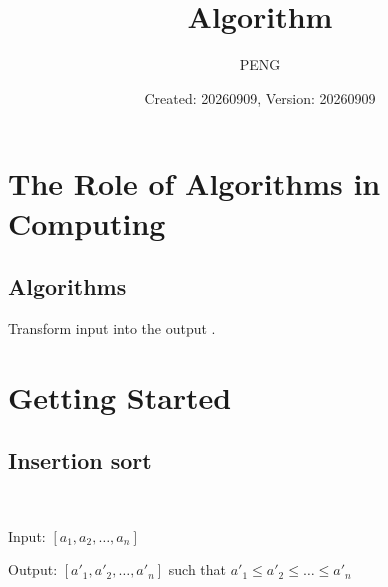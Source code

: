 \documentclass{article}
\title{Algorithm}
\author{PENG}
\date{Created: 20260909, Version: 20260909}
\begin{document}
\maketitle
\tableofcontents
\section{The Role of Algorithms in Computing}
\subsection{Algorithms}
\begin{definition}[algorithm]
    Transform input into the output \cite{CORMEN_1990_INTRODUCTION_TO_ALGORITHMS}.
\end{definition}

\section{Getting Started}
\subsection{Insertion sort}
\begin{definition}~

    Input: $\left[a_{1}, a_{2}, \ldots, a_{n}\right]$

    Output: $\left[a'_{1}, a'_{2}, \ldots, a'_{n}\right]$ such that $a'_{1} \leq a'_{2} \leq \ldots \leq a'_{n}$
\end{definition}


\printbibliography
\end{document}
